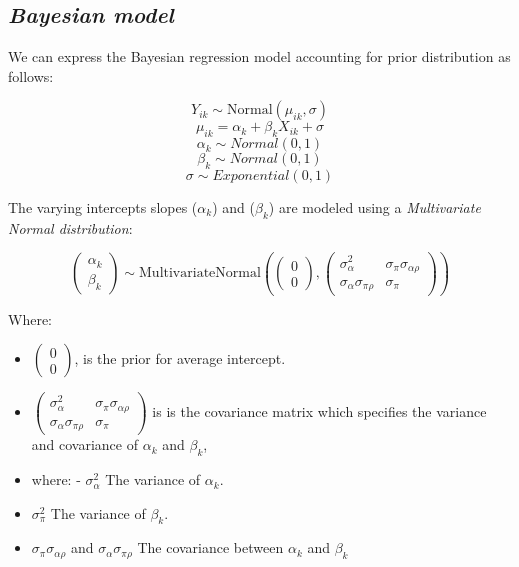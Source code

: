 \documentclass[
  letterpaper,
  DIV=11,
  numbers=noendperiod]{scrreprt}
\begin{document}
\subsection{\texorpdfstring{\emph{Bayesian
model}}{Bayesian model}}\label{bayesian-model-5}

We can express the Bayesian regression model accounting for prior
distribution as follows:

\[
Y_{ik} \sim \text{Normal}(\mu_{ik} , \sigma)
\] \[
\mu_{ik} = \alpha_k + \beta_k X_{ik} + \sigma 
\] \[
\alpha_k \sim Normal(0,1) 
\] \[
\beta_k \sim Normal(0,1)
\] \[
\sigma \sim Exponential(0,1)
\]

The varying intercepts slopes (\(\alpha_k\)) and (\(\beta_k\)) are
modeled using a \emph{Multivariate Normal distribution}:

\[ 
\begin{pmatrix} 
\alpha_k \\ 
\beta_k 
\end{pmatrix} \sim \text{MultivariateNormal}\left( 
\begin{pmatrix} 
0 \\ 
0 
\end{pmatrix}, 
\begin{pmatrix} 
\sigma_\alpha^2 & \sigma_\pi \sigma_{\alpha\rho} \\ 
\sigma_\alpha \sigma_{\pi\rho} & \sigma_\pi 
\end{pmatrix} 
\right) 
\]

Where:

\begin{itemize}
\item
  \(\left(\begin{array}{cc} 0 \\0\end{array}\right)\), is the prior for
  average intercept.
\item
  \(\left(\begin{array}{cc} \sigma_\alpha^2 & \sigma_\pi\sigma_{\alpha\rho} \\ \sigma_\alpha\sigma_{\pi\rho} & \sigma_\pi \end{array}\right)\)
  is is the covariance matrix which specifies the variance and
  covariance of \(\alpha_k\) and \(\beta_k\),
\item
  where: - \(\sigma_\alpha^2\) The variance of \(\alpha_k\).
\item
  \(\sigma_\pi^2\) The variance of \(\beta_k\).
\item
  \(\sigma_\pi\sigma_{\alpha\rho}\) and
  \(\sigma_\alpha\sigma_{\pi\rho}\) The covariance between \(\alpha_k\)
  and \(\beta_k\)
\end{itemize}
\end{document}
